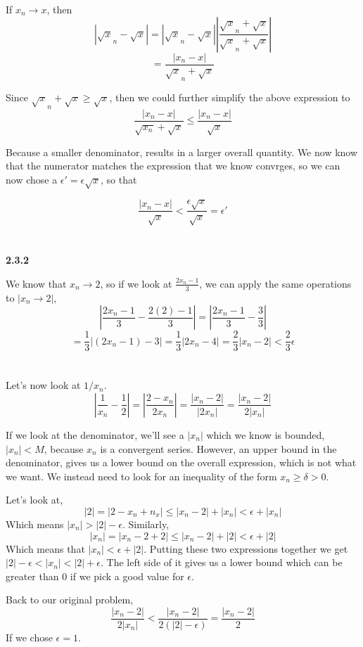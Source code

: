 If $x_n \rightarrow x$, then
$$
| \sqrt x_n - \sqrt x | = | \sqrt x_n - \sqrt x | \left| \frac{\sqrt x_n + \sqrt x}{\sqrt x_n + \sqrt x} \right|
$$
$$
= \frac{|x_n - x|}{\sqrt x_n + \sqrt x}
$$

Since $\sqrt x_n + \sqrt x \geq \sqrt x$, then we could further simplify the above expression to
$$
\frac{|x_n - x|}{\sqrt{x_n} + \sqrt{x}} \leq \frac{|x_n - x|}{\sqrt{x}}
$$

Because a smaller denominator, results in a larger overall quantity.
We now know that the numerator matches the expression that we know convrges, so we can now chose
a $\epsilon' = \epsilon \sqrt{x}$, so that

$$
\frac{|x_n - x|}{\sqrt{x}} < \frac{\epsilon \sqrt{x}}{\sqrt{x}} = \epsilon'
$$
\\~\\


\textbf{2.3.2}

We know that $x_n \rightarrow 2$, so if we look at $ \frac{2x_n -1}{3} $, we can apply
the same operations to $|x_n \rightarrow 2|$,
$$
\left| \frac{2x_n -1}{3} - \frac{2(2) -1}{3} \right| = \left| \frac{2x_n -1}{3} - \frac{3}{3} \right|
$$
$$
= \frac{1}{3} |(2x_n - 1) - 3| = \frac{1}{3} | 2x_n - 4 | = \frac{2}{3} |x_n - 2| < \frac{2}{3} \epsilon
$$
\\~\\

Let's now look at $1/x_n$.
$$
\left| \frac{1}{x_n} - \frac{1}{2} \right| = \left| \frac{2 - x_n}{2x_n} \right| = 
\frac{| x_n - 2 |}{|2x_n|} = \frac{| x_n - 2 |}{2|x_n|}
$$

If we look at the denominator, we'll see a $|x_n|$ which we know is bounded, $|x_n| < M$, because
$x_n$ is a convergent series.
However, an upper bound in the denominator, gives us a lower bound on the overall expression, which
is not what we want.
We instead need to look for an inequality of the form $x_n \geq \delta > 0$.

Let's look at,
$$
|2| = |2 - x_n + n_x| \leq |x_n - 2| + |x_n| < \epsilon + |x_n|
$$
Which means $|x_n| > |2| - \epsilon$.
Similarly,
$$
|x_n| = |x_n - 2 + 2| \leq |x_n - 2| + |2| < \epsilon + |2|
$$
Which means that $|x_n| < \epsilon + |2|$.
Putting these two expressions together we get $|2| - \epsilon < |x_n| < |2| + \epsilon$.
The left side of it gives us a lower bound which can be greater than 0 if we pick a good value for $\epsilon$.

Back to our original problem,
$$
\frac{| x_n - 2 |}{2|x_n|} < \frac{| x_n - 2 |}{2(|2| - \epsilon)} = \frac{| x_n - 2 |}{2}
$$
If we chose $\epsilon = 1$.
\\~\\



